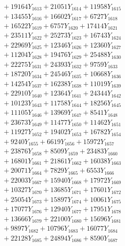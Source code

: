 \documentclass[a4paper,10pt]{article}
\begin{document}
{\begin{align}
&\;  + 19164 Y_{1613} + 21051 Y_{1614} + 11958 Y_{1615} \\[0.3ex]
&\;  + 13455 Y_{1616} + 16602 Y_{1617} + 6727 Y_{1618} \\[0.5ex]\allowbreak
&\;  + 16522 Y_{1619} + 6757 Y_{1620} + 17414 Y_{1621} \\[0.3ex]
&\;  + 23511 Y_{1622} + 25273 Y_{1623} + 16743 Y_{1624} \\[0.3ex]
&\;  + 22969 Y_{1625} + 12346 Y_{1626} + 12360 Y_{1627} \\[0.3ex]
&\;  + 11204 Y_{1628} + 19476 Y_{1629} + 25488 Y_{1630} \\[0.3ex]
&\;  + 22275 Y_{1631} + 24393 Y_{1632} + 9759 Y_{1633} \\[0.3ex]
&\;  + 18720 Y_{1634} + 24546 Y_{1635} + 10668 Y_{1636} \\[0.3ex]
&\;  + 14254 Y_{1637} + 16238 Y_{1638} + 11019 Y_{1639} \\[0.3ex]
&\;  + 22910 Y_{1640} + 12364 Y_{1641} + 24344 Y_{1642} \\[0.3ex]
&\;  + 10123 Y_{1643} + 11758 Y_{1644} + 18256 Y_{1645} \\[0.3ex]
&\;  + 11105 Y_{1646} + 13969 Y_{1647} + 8541 Y_{1648} \\[0.5ex]\allowbreak
&\;  + 23673 Y_{1649} + 11477 Y_{1650} + 11462 Y_{1651} \\[0.3ex]
&\;  + 11927 Y_{1652} + 19402 Y_{1653} + 16782 Y_{1654} \\[0.3ex]
&\;  + 9240 Y_{1655} + 6619 Y_{1656} + 15972 Y_{1657} \\[0.3ex]
&\;  + 23876 Y_{1658} + 8509 Y_{1659} + 23483 Y_{1660} \\[0.3ex]
&\;  + 16801 Y_{1661} + 21861 Y_{1662} + 16038 Y_{1663} \\[0.3ex]
&\;  + 20071 Y_{1664} + 7829 Y_{1665} + 6553 Y_{1666} \\[0.3ex]
&\;  + 22003 Y_{1667} + 15940 Y_{1668} + 17972 Y_{1669} \\[0.3ex]
&\;  + 10327 Y_{1670} + 13685 Y_{1671} + 17601 Y_{1672} \\[0.3ex]
&\;  + 25054 Y_{1673} + 15897 Y_{1674} + 10061 Y_{1675} \\[0.3ex]
&\;  + 17077 Y_{1676} + 12940 Y_{1677} + 17951 Y_{1678} \\[0.5ex]\allowbreak
&\;  + 13666 Y_{1679} + 22100 Y_{1680} + 15696 Y_{1681} \\[0.3ex]
&\;  + 9897 Y_{1682} + 10796 Y_{1683} + 16077 Y_{1684} \\[0.3ex]
&\;  + 22128 Y_{1685} + 24894 Y_{1686} + 8590 Y_{1687} \\[0.3ex]

\end{align}}
\end{document}
